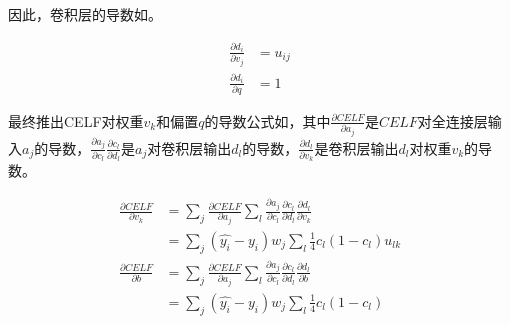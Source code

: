 因此，卷积层的导数如。

\begin{equation}\label{eq:convolution-bp}
\begin{aligned}
\frac{\partial d_i}{\partial v_j} &= u_{ij} \\
\frac{\partial d_i}{\partial q} &= 1
\end{aligned}
\end{equation}

最终推出CELF对权重$v_k$和偏置$q$的导数公式如，其中$\frac{\partial CELF}{\partial a_j}$是$CELF$对全连接层输入$a_j$的导数，$\frac{\partial a_j}{\partial c_l} \frac{\partial c_l}{\partial d_l}$是$a_j$对卷积层输出$d_l$的导数，$\frac{\partial d_l}{\partial v_k}$是卷积层输出$d_l$对权重$v_k$的导数。

\begin{equation}\label{eq:CELF-v-q}
\begin{aligned}
\frac{\partial CELF}{\partial v_k} &=
\sum_{j}\frac{\partial CELF}{\partial a_j} %
\sum_{l}\frac{\partial a_j}{\partial c_l} \frac{\partial c_l}{\partial d_l} %
\frac{\partial d_l}{\partial v_k} \\ %
&=
\sum_{j}(\hat{y_i} - y_i)w_j %
\sum_{l}\frac{1}{4}c_l(1-c_l) %
u_{lk} \\ %
\frac{\partial CELF}{\partial b} &=
\sum_{j}\frac{\partial CELF}{\partial a_j} %
\sum_{l}\frac{\partial a_j}{\partial c_l} \frac{\partial c_l}{\partial d_l} %
\frac{\partial d_l}{\partial b} \\ %
&=
\sum_{j}(\hat{y_i} - y_i)w_j %
\sum_{l}\frac{1}{4}c_l(1-c_l) %
\end{aligned}
\end{equation}

